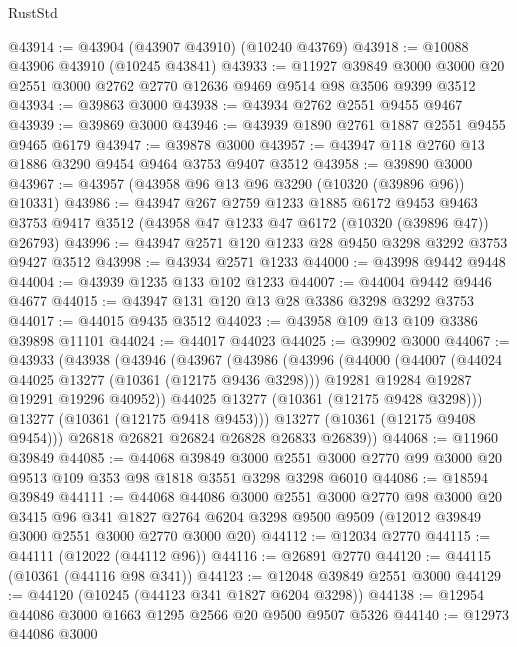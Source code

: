 \begin{lexlean}{RustStd}
\begin{coremodule}
@43914 := @43904 (@43907 @43910) (@10240 @43769)
@43918 := @10088 @43906 @43910 (@10245 @43841)
@43933 := @11927
    @39849
    @3000
    @3000
    @20
    @2551
    @3000
    @2762
    @2770
    @12636
    @9469
    @9514
    @98
    @3506
    @9399
    @3512
@43934 := @39863 @3000
@43938 := @43934 @2762 @2551 @9455 @9467
@43939 := @39869 @3000
@43946 := @43939 @1890 @2761 @1887 @2551 @9455 @9465 @6179
@43947 := @39878 @3000
@43957 := @43947 @118 @2760 @13 @1886 @3290 @9454 @9464 @3753 @9407 @3512
@43958 := @39890 @3000
@43967 := @43957 (@43958 @96 @13 @96 @3290 (@10320 (@39896 @96)) @10331)
@43986 := @43947
    @267
    @2759
    @1233
    @1885
    @6172
    @9453
    @9463
    @3753
    @9417
    @3512
    (@43958 @47 @1233 @47 @6172 (@10320 (@39896 @47)) @26793)
@43996 := @43947 @2571 @120 @1233 @28 @9450 @3298 @3292 @3753 @9427 @3512
@43998 := @43934 @2571 @1233
@44000 := @43998 @9442 @9448
@44004 := @43939 @1235 @133 @102 @1233
@44007 := @44004 @9442 @9446 @4677
@44015 := @43947 @131 @120 @13 @28 @3386 @3298 @3292 @3753
@44017 := @44015 @9435 @3512
@44023 := @43958 @109 @13 @109 @3386 @39898 @11101
@44024 := @44017 @44023
@44025 := @39902 @3000
@44067 := @43933
    (@43938
      (@43946
        (@43967
          (@43986
            (@43996
              (@44000
                (@44007
                  (@44024 @44025 @13277 (@10361 (@12175 @9436 @3298)))
                  @19281
                  @19284
                  @19287
                  @19291
                  @19296
                  @40952))
              @44025
              @13277
              (@10361 (@12175 @9428 @3298)))
            @13277
            (@10361 (@12175 @9418 @9453)))
          @13277
          (@10361 (@12175 @9408 @9454)))
        @26818
        @26821
        @26824
        @26828
        @26833
        @26839))
@44068 := @11960 @39849
@44085 := @44068
    @39849
    @3000
    @2551
    @3000
    @2770
    @99
    @3000
    @20
    @9513
    @109
    @353
    @98
    @1818
    @3551
    @3298
    @3298
    @6010
@44086 := @18594 @39849
@44111 := @44068
    @44086
    @3000
    @2551
    @3000
    @2770
    @98
    @3000
    @20
    @3415
    @96
    @341
    @1827
    @2764
    @6204
    @3298
    @9500
    @9509
    (@12012 @39849 @3000 @2551 @3000 @2770 @3000 @20)
@44112 := @12034 @2770
@44115 := @44111 (@12022 (@44112 @96))
@44116 := @26891 @2770
@44120 := @44115 (@10361 (@44116 @98 @341))
@44123 := @12048 @39849 @2551 @3000
@44129 := @44120 (@10245 (@44123 @341 @1827 @6204 @3298))
@44138 := @12954 @44086 @3000 @1663 @1295 @2566 @20 @9500 @9507 @5326
@44140 := @12973 @44086 @3000

\end{coremodule}
\end{lexlean}
